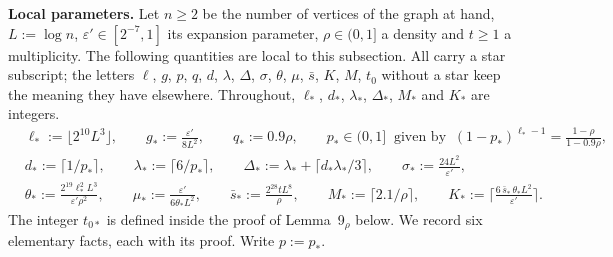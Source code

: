 \medskip\noindent\textbf{Local parameters.} Let $n\ge2$ be the number of
vertices of the graph at hand, $L:=\log n$, $\varepsilon'\in[2^{-7},1]$
its expansion parameter, $\rho\in(0,1]$ a density and $t\ge1$ a
multiplicity. The following quantities are local to this subsection. All
carry a star subscript; the letters $\ell$, $g$, $p$, $q$, $d$,
$\lambda$, $\Delta$, $\sigma$, $\theta$, $\mu$, $\bar s$, $K$, $M$, $t_0$
without a star keep the meaning they have elsewhere. Throughout,
$\ell_*$, $d_*$, $\lambda_*$, $\Delta_*$, $M_*$ and $K_*$ are integers.
\begin{equation}\label{s3:eqStar}
\begin{aligned}
&\ell_*:=\lfloor 2^{10}L^3\rfloor,\qquad g_*:=\frac{\varepsilon'}{8L^2},\qquad q_*:=0.9\rho,\qquad
 p_*\in(0,1]\ \text{ given by }\ (1-p_*)^{\ell_*-1}=\frac{1-\rho}{1-0.9\rho},\\
&d_*:=\lceil 1/p_*\rceil,\qquad \lambda_*:=\lceil 6/p_*\rceil,\qquad
 \Delta_*:=\lambda_*+\lceil d_*\lambda_*/3\rceil,\qquad \sigma_*:=\frac{24L^2}{\varepsilon'},\\
&\theta_*:=\frac{2^{19}\ell_*^2L^3}{\varepsilon'\rho^2},\qquad
 \mu_*:=\frac{\varepsilon'}{6\theta_*L^2},\qquad
 \bar s_*:=\frac{2^{28}tL^8}{\rho},\qquad
 M_*:=\lceil 2.1/\rho\rceil,\qquad
 K_*:=\Big\lceil\frac{6\,\bar s_*\,\theta_*L^2}{\varepsilon'}\Big\rceil .
\end{aligned}
\end{equation}
The integer $t_{0*}$ is defined inside the proof of Lemma~9$_\rho$
below. We record six elementary facts, each with its
proof. Write $p:=p_*$.
